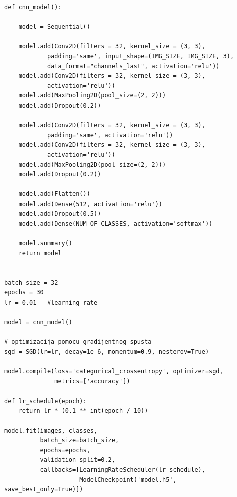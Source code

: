 \documentclass[a4paper]{article}
\begin{document}
\begin{lstlisting}[caption={Model 1},frame=single, label=code:model1]
def cnn_model():
    
    model = Sequential()

    model.add(Conv2D(filters = 32, kernel_size = (3, 3), 
    		padding='same', input_shape=(IMG_SIZE, IMG_SIZE, 3), 
    		data_format="channels_last", activation='relu'))
    model.add(Conv2D(filters = 32, kernel_size = (3, 3), 
    		activation='relu'))
    model.add(MaxPooling2D(pool_size=(2, 2)))
    model.add(Dropout(0.2))

    model.add(Conv2D(filters = 32, kernel_size = (3, 3), 
    		padding='same', activation='relu'))
    model.add(Conv2D(filters = 32, kernel_size = (3, 3), 
    		activation='relu'))
    model.add(MaxPooling2D(pool_size=(2, 2)))
    model.add(Dropout(0.2))
    
    model.add(Flatten())
    model.add(Dense(512, activation='relu'))
    model.add(Dropout(0.5))
    model.add(Dense(NUM_OF_CLASSES, activation='softmax'))
    
    model.summary()
    return model


batch_size = 32
epochs = 30
lr = 0.01   #learning rate

model = cnn_model()

# optimizacija pomocu gradijentnog spusta
sgd = SGD(lr=lr, decay=1e-6, momentum=0.9, nesterov=True)

model.compile(loss='categorical_crossentropy', optimizer=sgd, 
			  metrics=['accuracy'])

def lr_schedule(epoch):
    return lr * (0.1 ** int(epoch / 10))

model.fit(images, classes,
          batch_size=batch_size,
          epochs=epochs,
          validation_split=0.2,
          callbacks=[LearningRateScheduler(lr_schedule), 
          			 ModelCheckpoint('model.h5', save_best_only=True)])
\end{lstlisting}
\end{document}

